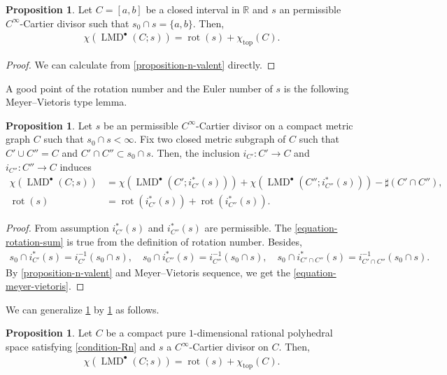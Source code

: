 \documentclass[a4paper,dvipdfmx,reqno,12pt]{amsart}
\theoremstyle{definition}
\newtheorem{proposition}[theorem]{Proposition}
\newcommand{\opn}[1]{\operatorname{#1}}
\numberwithin{equation}{section}
\begin{document}
\begin{proposition}
\label{proposition-simple-interval-rr}
Let $C=[a,b]$ be a closed interval in $\mathbb{R}$
and $s$ an permissible $C^{\infty}$-Cartier divisor 
such that $s_0\cap s=\{a,b\}$. Then,
\begin{align}
\chi(\opn{LMD}^{\bullet}(C;s))=\opn{rot}(s)+
\chi_{\opn{top}}(C).
\end{align}
\end{proposition}
\begin{proof}
We can calculate from 
\cref{proposition-n-valent} directly.
\end{proof}

A good point of the rotation number and the 
Euler number of $s$ is the 
following Meyer--Vietoris type lemma.

\begin{proposition}
\label{proposition-gluing-formula}
Let $s$ be an permissible $C^{\infty}$-Cartier divisor on a
compact metric graph $C$ such that $s_0\cap s<\infty$.
Fix two closed metric subgraph of $C$ such that
$C' \cup C''=C$ and $C'\cap C''\subset s_0 \cap s$.
Then, 
the inclusion $i_{C'}\colon C'\to C$ 
and $i_{C''}\colon C''\to C$ induces
\begin{align}
\label{equation-meyer-vietoris}
\chi(\opn{LMD}^{\bullet}(C;s))
&=\chi(\opn{LMD}^{\bullet}(C';i_{C'}^{*}(s)))
+\chi(\opn{LMD}^{\bullet}(C'';i_{C''}^{*}(s)))
-\sharp(C'\cap C''), \\
\label{equation-rotation-sum}
\opn{rot}(s)&=\opn{rot}(i_{C'}^{*}(s))
+\opn{rot}(i_{C''}^{*}(s)).
\end{align}
\end{proposition}
\begin{proof}
From assumption $i^{*}_{C'}(s)$ and 
$i^{*}_{C''}(s)$ are permissible.
The \cref{equation-rotation-sum} is true from
the definition of rotation number. 
 Besides,
\begin{align}
s_0\cap i^{*}_{C'}(s)=i^{-1}_{C'}(s_0\cap s), \quad 
s_0\cap i^{*}_{C''}(s)=i^{-1}_{C''}(s_0\cap s), \quad
s_0\cap i^{*}_{C'\cap C''}(s)=
i^{-1}_{C'\cap C''}(s_0\cap s).
\end{align}
By \cref{proposition-n-valent} 
and Meyer--Vietoris sequence, we get 
the \cref{equation-meyer-vietoris}.
\end{proof}

We can generalize
\cref{proposition-simple-interval-rr} by
\cref{proposition-gluing-formula} as follows.

\begin{proposition}
\label{proposition-MRR-1-dim-poly-space}
Let $C$ be a compact pure $1$-dimensional rational 
polyhedral space satisfying \cref{condition-Rn} 
and $s$ a $C^{\infty}$-Cartier divisor on $C$. Then,
\begin{align}
\chi(\opn{LMD}^{\bullet}(C;s))=\opn{rot}(s)+
\chi_{\opn{top}}(C).
\end{align}
\end{proposition}
\end{document}
